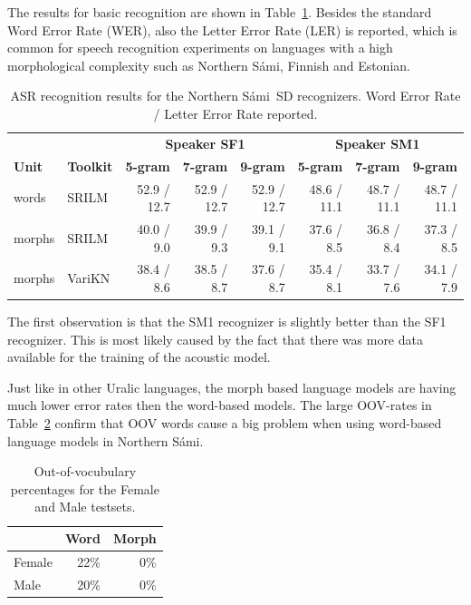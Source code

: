 \documentclass[b5paper]{article}
\newcommand{\ns}{Northern Sámi}
\begin{document}
The results for basic recognition are shown in Table~\ref{tbl:samibasic}. Besides the standard Word Error Rate (WER), also the Letter Error Rate (LER) is reported, which is common for speech recognition experiments on languages with a high morphological complexity such as \ns, Finnish and Estonian.

\begin{table}[!h]
\centering
\begin{tabular}{ll|rrr|rrr}
& & \multicolumn{3}{|c|}{\textbf{Speaker SF1}} & \multicolumn{3}{|c}{\textbf{Speaker SM1}} \\
 \textbf{Unit} & \textbf{Toolkit} & \textbf{5-gram} & \textbf{7-gram} & \textbf{9-gram} & \textbf{5-gram} & \textbf{7-gram} & \textbf{9-gram}\\\hline
 words & SRILM & 52.9 / 12.7 & 52.9 / 12.7& 52.9 / 12.7&48.6 / 11.1 & 48.7 / 11.1 & 48.7 / 11.1\\
morphs & SRILM & 40.0 /  9.0 & 39.9 / 9.3& 39.1 / 9.1 & 37.6 / 8.5 & 36.8 / 8.4 & 37.3 / 8.5 \\
 morphs & VariKN  & 38.4 / 8.6& 38.5 / 8.7  & 37.6 / 8.7 & 35.4 / 8.1 &  33.7 / 7.6 & 34.1 / 7.9 \\

\end{tabular}
\caption{ASR recognition results for the \ns\ SD recognizers. Word Error Rate / Letter Error Rate reported.\label{tbl:samibasic}}
\end{table}


The first observation is that the SM1 recognizer is slightly better than the SF1 recognizer. This is most likely caused by the fact that there was more data available for the training of the acoustic model.

Just like in other Uralic languages, the morph based language models are having much lower error rates then the word-based models. The large OOV-rates in Table~\ref{tbl:samioov} confirm that OOV words cause a big problem when using word-based language models in \ns.

\begin{table}[!h]
\centering
\begin{tabular}{lrr}
& Word & Morph\\\hline
Female &  22\% & 0\% \\
Male & 20\% & 0\%\\
\end{tabular}
\caption{Out-of-vocubulary percentages for the Female and Male testsets. \label{tbl:samioov}}
\end{table}
\end{document}
